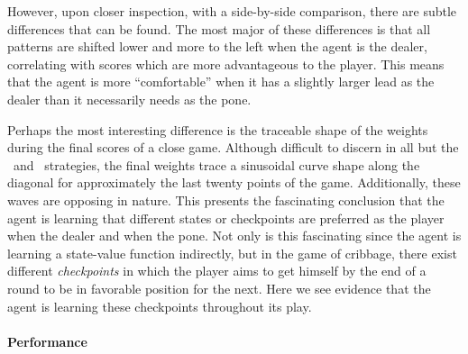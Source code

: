 However,
upon closer inspection,
with a side-by-side comparison,
there are subtle differences that can be found.
%
The most major of these differences is that all patterns are shifted lower and
more to the left when the agent is the dealer,
correlating with scores which are more advantageous to the player.
%
This means that the agent is more ``comfortable'' when it has a slightly larger
lead as the dealer than it necessarily needs as the pone.



Perhaps the most interesting difference is the traceable shape of the weights
during the final scores of a close game.
%
Although difficult to discern in all but the \handmaxmin\ and \handmaxavg\ 
strategies,
the final weights trace a sinusoidal curve shape along the diagonal
for approximately the last twenty points of the game.
%
Additionally,
these waves are opposing in nature.
%
This presents the fascinating conclusion that the agent is learning
that different states or checkpoints are preferred as the player when
the dealer and when the pone.
%
Not only is this fascinating since the agent is learning a state-value function
indirectly,
but in the game of cribbage,
there exist different \textit{checkpoints} in which the player aims to get
himself by the end of a round to be in favorable position for the next.
%
Here we see evidence that the agent is learning these checkpoints throughout its
play.


\paragraph*{Performance}

